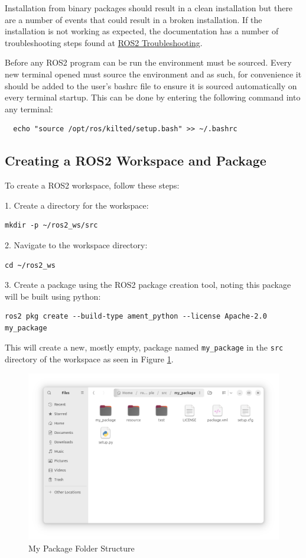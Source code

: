 \documentclass[10pt,a4paper,english]{article}
\begin{document}
Installation from binary packages should result in a clean installation but there are a number of events that could result in a broken installation. If the installation is not working as expected, the documentation has a number of troubleshooting steps found at \href{https://docs.ros.org/en/kilted/Troubleshooting.html}{ROS2 Troubleshooting}.

Before any ROS2 program can be run the environment must be sourced. Every new terminal opened must source the environment and as such, for convenience it should be added to the user's bashrc file to ensure it is sourced automatically on every terminal startup. This can be done by entering the following command into any terminal: \begin{lstlisting}
  echo "source /opt/ros/kilted/setup.bash" >> ~/.bashrc 
\end{lstlisting} \par

\subsection{Creating a ROS2 Workspace and Package}
To create a ROS2 workspace, follow these steps:

1. Create a directory for the workspace:
\begin{lstlisting}
mkdir -p ~/ros2_ws/src
\end{lstlisting}

2. Navigate to the workspace directory:
\begin{lstlisting}
cd ~/ros2_ws
\end{lstlisting}

3. Create a package using the ROS2 package creation tool, noting this package will be built using python:
\begin{lstlisting}
ros2 pkg create --build-type ament_python --license Apache-2.0 my_package
\end{lstlisting}

This will create a new, mostly empty, package named \texttt{my\_package} in the \texttt{src} directory of the workspace as seen in Figure \ref{fig:my_package_folder}.
\begin{figure}[ht]
    \centering
    \includegraphics[width=1.0\textwidth]{my_package_folder.png}
    \caption{My Package Folder Structure}
    \label{fig:my_package_folder}
\end{figure}
\end{document}
